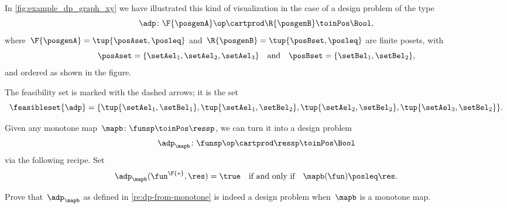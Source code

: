 \begin{marginfigure}
    \centering
    \caption{}
    \label{fig:example_dp_graph_xy}
\end{marginfigure}

\begin{example}
    \label{exa:visualize-dp}
    In \cref{fig:example_dp_graph_xy} we have illustrated this kind of visualization in the case of a design problem of the type
    \begin{equation*}
        \adp \colon \F{\posgenA} \op \cartprod  \R{\posgenB} \toinPos \Bool,
    \end{equation*}
    where~$\F{\posgenA} = \tup{\posAset, \posleq}$ and~$ \R{\posgenB} = \tup{\posBset, \posleq}$ are finite posets, with
    \begin{equation}
        \posAset = \{ \setAel_1, \setAel_2, \setAel_3 \}
        \quad \text{and} \quad
        \posBset =  \{ \setBel_1, \setBel_2\},
    \end{equation}
    and ordered as shown in the figure.

    The feasibility set is marked with the dashed arrows; it is the set
    \begin{equation*}
        \feasibleset{\adp} = \{\tup{\setAel_1, \setBel_1}, \tup{\setAel_1, \setBel_2}, \tup{\setAel_2, \setBel_2}, \tup{\setAel_3, \setBel_2} \}.
    \end{equation*}
\end{example}

\begin{remark}
    \label{re:dp-from-monotone}
    Given any monotone map~$\mapb\colon \funsp \toinPos \ressp$, we can turn it into a design problem
    \begin{equation*}
        \adp_\mapb \colon \funsp\op \cartprod \ressp \toinPos \Bool
    \end{equation*}
    via the following recipe.
    Set
    \begin{equation*}
        \adp_\mapb (\fun^\F{*}, \res) = \true \quad \text{if and only if} \quad \mapb(\fun) \posleq \res.
    \end{equation*}
\end{remark}

\begin{exercise}
    \label{ex:adp-monotone}
    Prove that~$\adp_\mapb$ as defined in \cref{re:dp-from-monotone} is indeed a design problem when~$\mapb$ is a monotone map.
\end{exercise}
\begin{solution}
\end{solution}

